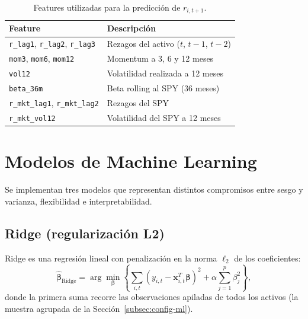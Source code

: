 \begin{table}[htbp]
    \centering
    \caption{Features utilizadas para la predicción de $r_{i,t+1}$.}
    \label{tab:features}
    \begin{tabular}{ll}
        \toprule
        \textbf{Feature} & \textbf{Descripción} \\
        \midrule
        \texttt{r\_lag1}, \texttt{r\_lag2}, \texttt{r\_lag3} & Rezagos del activo ($t$, $t-1$, $t-2$) \\
        \texttt{mom3}, \texttt{mom6}, \texttt{mom12} & Momentum a 3, 6 y 12 meses \\
        \texttt{vol12} & Volatilidad realizada a 12 meses \\
        \texttt{beta\_36m} & Beta rolling al SPY (36 meses) \\
        \texttt{r\_mkt\_lag1}, \texttt{r\_mkt\_lag2} & Rezagos del SPY \\
        \texttt{r\_mkt\_vol12} & Volatilidad del SPY a 12 meses \\
        \bottomrule
    \end{tabular}
\end{table}

\section{Modelos de Machine Learning}

Se implementan tres modelos que representan distintos compromisos entre sesgo
y varianza, flexibilidad e interpretabilidad.

\subsection{Ridge (regularización L2)}

Ridge \cite{HoerlKennard1970} es una regresión lineal con penalización en la
norma $\ell_2$ de los coeficientes:
\begin{equation}
    \hat{\boldsymbol{\beta}}_{\text{Ridge}} =
    \arg\min_{\boldsymbol{\beta}} \left\{
    \sum_{i,t} (y_{i,t} - \mathbf{x}_{i,t}^T \boldsymbol{\beta})^2
    + \alpha \sum_{j=1}^{p} \beta_j^2
    \right\},
    \label{eq:ridge}
\end{equation}
donde la primera suma recorre las observaciones apiladas de todos los activos
(la muestra agrupada de la Sección~\ref{subsec:config-ml}).

